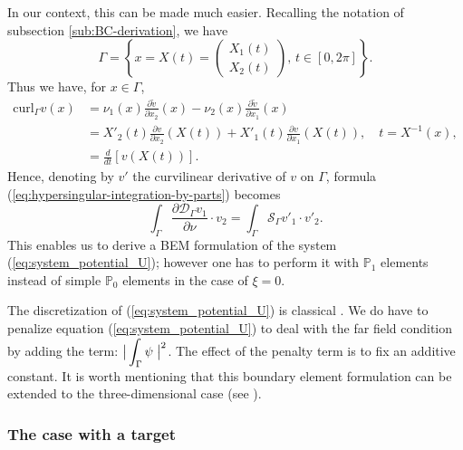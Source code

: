 In our context, this can be made much easier. Recalling the
notation of subsection \ref{sub:BC-derivation}, we have
\[
\Gamma=\left\{ x=X(t)=\left(\begin{array}{c}
X_{1}(t)\\
X_{2}(t)
\end{array}\right),\, t\in[0,2\pi]\right\} .
\]
Thus we have, for $x\in\Gamma$,
\[
\begin{alignedat}{1}\textrm{curl}_{\Gamma}v(x) & =\nu_{1}(x)\frac{\partial\tilde{v}}{\partial x_{2}}(x)
-\nu_{2}(x)\frac{\partial\tilde{v}}{\partial x_{1}} (x)\\
 & =X'_{2}(t)\frac{\partial v}{\partial x_{2}}(X(t))+X'_{1}(t)\frac{\partial v}{\partial x_{1}}(X(t)), \quad t=X^{-1}(x),\\
 & =\frac{d}{dt}\left[v(X(t))\right].
\end{alignedat}
\]
Hence, denoting by $v'$ the curvilinear derivative of $v$ on
$\Gamma$, formula (\ref{eq:hypersingular-integration-by-parts})
becomes
\[
\int_\Gamma \frac{\partial\mathcal{D}_{\Gamma} v_{1}}{\partial\nu}
\cdot v_{2} = \int_\Gamma \mathcal{S}_{\Gamma}v'_{1} \cdot v'_{2}.
\]
This enables us to derive a BEM formulation of the system
(\ref{eq:system_potential_U}); however one has to perform it with
$\mathbb{P}_{1}$ elements instead of simple $\mathbb{P}_{0}$
elements in the case of $\xi=0$.

The discretization of (\ref{eq:system_potential_U}) is classical
\cite{steinbach2008numerical}. We do have to penalize equation
(\ref{eq:system_potential_U}) to deal with the far field condition
by adding the term: $\displaystyle \big|\int_{\Gamma} \psi\; \big|^2$. The
effect of the penalty term is to fix an additive constant. It is
worth mentioning  that this boundary element formulation can be
extended to the three-dimensional case (see
\cite{nedelec1982integral}).

\subsubsection{The case with a target}

